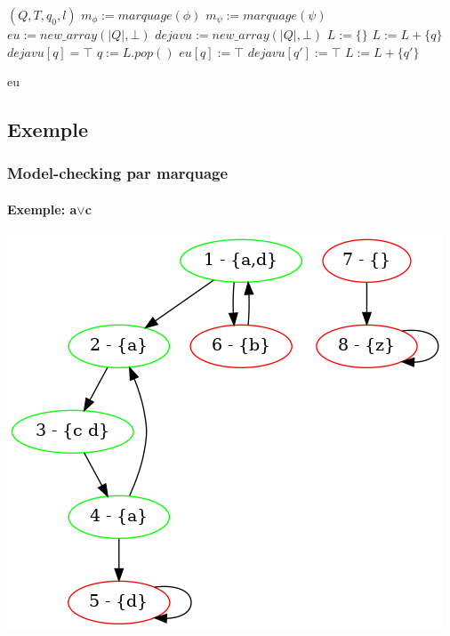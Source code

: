 \documentclass[11pt]{beamer}
\begin{document}
\begin{algorithm}[h!]
\caption{$E\phi U\psi$}

\begin{multicols}{2}
\begin{algorithmic}[1]
    \REQUIRE $(Q, T, q_0, l)$
    \STATE $m_\phi := marquage(\phi)$
    \STATE $m_\psi := marquage(\psi)$
    \STATE $eu := new\_array(|Q|, \bot)$
    \STATE $dejavu := new\_array(|Q|, \bot)$
    \STATE $L := \{\}$
            \STATE $L := L + \{ q \}$
            \STATE $dejavu[q] = \top$
        \ENDIF
    \ENDFOR
        \STATE $q := L.pop()$
        \STATE $eu[q] := \top$
                \STATE $dejavu[q'] := \top$
                    \STATE $L := L + \{q'\}$
                \ENDIF
            \ENDIF
        \ENDFOR
    \ENDWHILE

    \RETURN eu
\end{algorithmic}
\end{multicols}
\end{algorithm}

\subsection{Exemple}
\begin{frame}
    \frametitle{Model-checking par marquage}
    \framesubtitle{Exemple: a$\lor$c}

    \includegraphics[scale=0.4]{imgs/marquage1.png}
\end{frame}
\end{document}
